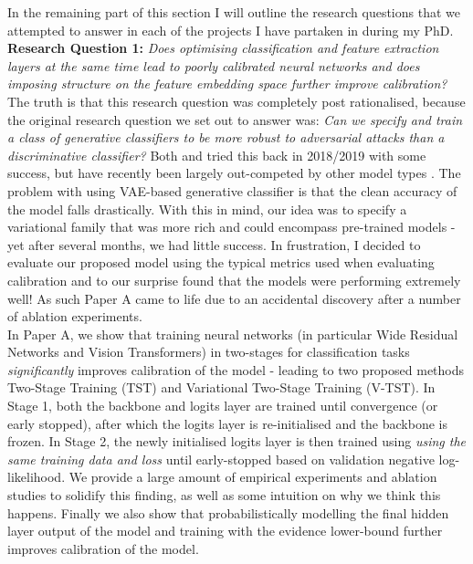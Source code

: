 \noindent In the remaining part of this section I will outline the research questions that we attempted to answer in each of the projects I have partaken in during my PhD. \\

\noindent \textbf{Research Question 1:} \textit{Does optimising classification and feature extraction layers at the same time lead to poorly calibrated neural networks and does imposing structure on the feature embedding space further improve calibration?}\\

\noindent The truth is that this research question was completely post rationalised, because the original research question we set out to answer was: \textit{Can we specify and train a class of generative classifiers to be more robust to adversarial attacks than a discriminative classifier?} Both \cite{li2019are} and \cite{Schott2018TowardsTF} tried this back in 2018/2019 with some success, but have recently been largely out-competed by other model types \citep{pmlr-v202-wang23ad,bartoldson2024adversarial}. The problem with using VAE-based generative classifier is that the clean accuracy of the model falls drastically. With this in mind, our idea was to specify a variational family that was more rich and could encompass pre-trained models - yet after several months, we had little success. In frustration, I decided to evaluate our proposed model using the typical metrics used when evaluating calibration and to our surprise found that the models were performing extremely well! As such Paper A came to life due to an accidental discovery after a number of ablation experiments. \\

\noindent In Paper A, we show that training neural networks (in particular Wide Residual Networks and Vision Transformers) in two-stages for classification tasks \textit{significantly} improves calibration of the model - leading to two proposed methods Two-Stage Training (TST) and Variational Two-Stage Training (V-TST). In Stage 1, both the backbone and logits layer are trained until convergence (or early stopped), after which the logits layer is re-initialised and the backbone is frozen. In Stage 2, the newly initialised logits layer is then trained using \textit{using the same training data and loss} until early-stopped based on validation negative log-likelihood. We provide a large amount of empirical experiments and ablation studies to solidify this finding, as well as some intuition on why we think this happens. Finally we also show that probabilistically modelling the final hidden layer output of the model and training with the evidence lower-bound further improves calibration of the model. \\

